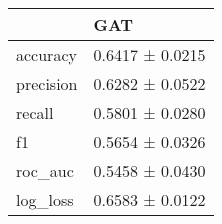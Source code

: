 \begin{tabular}{ll}
\toprule
 & GAT \\
\midrule
accuracy & 0.6417 ± 0.0215 \\
precision & 0.6282 ± 0.0522 \\
recall & 0.5801 ± 0.0280 \\
f1 & 0.5654 ± 0.0326 \\
roc_auc & 0.5458 ± 0.0430 \\
log_loss & 0.6583 ± 0.0122 \\
\bottomrule
\end{tabular}
